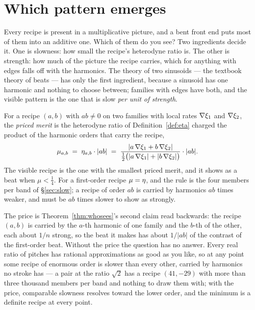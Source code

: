\section{Which pattern emerges}
\label{sec:selection}

Every recipe is present in a multiplicative picture, and a bent front end
puts most of them into an additive one. Which of them do you see? Two
ingredients decide it. One is slowness: how small the recipe's heterodyne
ratio is. The other is strength: how much of the picture the recipe
carries, which for anything with edges falls off with the harmonics. The
theory of two sinusoids --- the textbook theory of beats --- has only the
first ingredient, because a sinusoid has one harmonic and nothing to
choose between; families with edges have both, and the visible pattern is
the one that is slow \emph{per unit of strength}.

\begin{definition}
\label{def:merit}
For a recipe $(a,b)$ with $ab\ne0$ on two families with local rates
$\nabla\xi_1$ and $\nabla\xi_2$, the \emph{priced merit} is the heterodyne
ratio of Definition~\ref{def:eta} charged the product of the harmonic
orders that carry the recipe,
\[
  \mu_{a,b}\;=\;\eta_{a,b}\cdot|ab|
  \;=\;\frac{\lvert a\,\nabla\xi_1+b\,\nabla\xi_2\rvert}
            {\tfrac12\big(\lvert a\,\nabla\xi_1\rvert+\lvert b\,\nabla\xi_2\rvert\big)}\cdot|ab| .
\]
The visible recipe is the one with the smallest priced merit, and it shows
as a beat when $\mu<\tfrac14$. For a first-order recipe $\mu=\eta$, and the
rule is the four members per band of \S\ref{sec:slow}; a recipe of order
$ab$ is carried by harmonics $ab$ times weaker, and must be $ab$ times
slower to show as strongly.
\end{definition}

The price is Theorem~\ref{thm:whosees}'s second claim read backwards: the
recipe $(a,b)$ is carried by the $a$-th harmonic of one family and the
$b$-th of the other, each about $1/n$ strong, so the beat it makes has
about $1/|ab|$ of the contrast of the first-order beat. Without the price
the question has no answer. Every real ratio of pitches has rational
approximations as good as you like, so at any point some recipe of
enormous order is slower than every other, carried by harmonics no stroke
has --- a pair at the ratio $\sqrt2$ has a recipe $(41,-29)$ with more than
three thousand members per band and nothing to draw them with; with the
price, comparable slowness resolves toward the lower order, and the minimum
is a definite recipe at every point.

